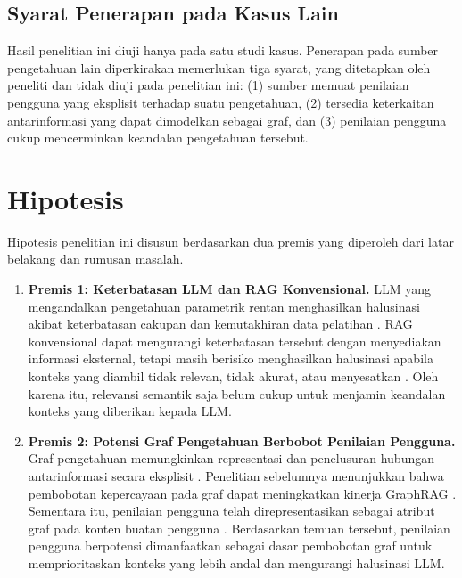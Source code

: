 \subsection*{Syarat Penerapan pada Kasus Lain}

Hasil penelitian ini diuji hanya pada satu studi kasus. Penerapan pada sumber pengetahuan lain diperkirakan memerlukan tiga syarat, yang ditetapkan oleh peneliti dan tidak diuji pada penelitian ini: (1) sumber memuat penilaian pengguna yang eksplisit terhadap suatu pengetahuan, (2) tersedia keterkaitan antarinformasi yang dapat dimodelkan sebagai graf, dan (3) penilaian pengguna cukup mencerminkan keandalan pengetahuan tersebut.

\section{Hipotesis}
\label{sec:hipotesis}

Hipotesis penelitian ini disusun berdasarkan dua premis yang diperoleh dari latar belakang dan rumusan masalah.

\begin{enumerate}
    \item \textbf{Premis 1: Keterbatasan LLM dan RAG Konvensional.}
    LLM yang mengandalkan pengetahuan parametrik rentan menghasilkan halusinasi akibat keterbatasan cakupan dan kemutakhiran data pelatihan \autocite{Huang2025, YizhengHuang2026, WangXL2026}. RAG konvensional dapat mengurangi keterbatasan tersebut dengan menyediakan informasi eksternal, tetapi masih berisiko menghasilkan halusinasi apabila konteks yang diambil tidak relevan, tidak akurat, atau menyesatkan \autocite{YizhengHuang2026, Huang2025, WangXL2026}. Oleh karena itu, relevansi semantik saja belum cukup untuk menjamin keandalan konteks yang diberikan kepada LLM.

    \item \textbf{Premis 2: Potensi Graf Pengetahuan Berbobot Penilaian Pengguna.}
    Graf pengetahuan memungkinkan representasi dan penelusuran hubungan antarinformasi secara eksplisit \autocite{Syeda2026, WangXL2026}. Penelitian sebelumnya menunjukkan bahwa pembobotan kepercayaan pada graf dapat meningkatkan kinerja GraphRAG \autocite{Shi2026}. Sementara itu, penilaian pengguna telah direpresentasikan sebagai atribut graf pada konten buatan pengguna \autocite{Kleybolte2026}. Berdasarkan temuan tersebut, penilaian pengguna berpotensi dimanfaatkan sebagai dasar pembobotan graf untuk memprioritaskan konteks yang lebih andal dan mengurangi halusinasi LLM.
\end{enumerate}

